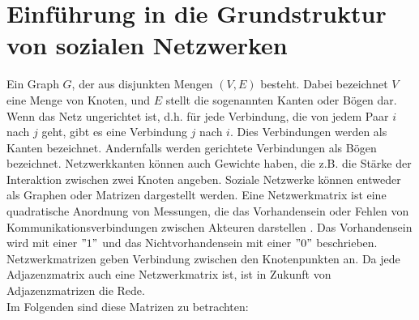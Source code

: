\section{Einführung in die Grundstruktur von sozialen Netzwerken}
Ein Graph $G$, der aus disjunkten Mengen $(V ,E)$ besteht. Dabei bezeichnet $V$ eine Menge von Knoten, und $E$ stellt die sogenannten Kanten oder Bögen dar.\\
Wenn das Netz ungerichtet ist, d.h. für jede Verbindung, die von jedem Paar $i$ nach $j$ geht, gibt es eine Verbindung $j$ nach $i$. Dies Verbindungen werden als Kanten bezeichnet. Andernfalls werden gerichtete Verbindungen
als Bögen bezeichnet. Netzwerkkanten können auch Gewichte haben, die z.B. die Stärke der Interaktion zwischen zwei Knoten angeben.
Soziale Netzwerke können entweder als Graphen oder Matrizen dargestellt werden. Eine Netzwerkmatrix ist eine quadratische Anordnung von Messungen, die das Vorhandensein oder Fehlen von Kommunikationsverbindungen zwischen Akteuren darstellen \cite{Hanneman}. Das Vorhandensein wird mit einer $"1"$ und das Nichtvorhandensein mit einer $"0"$ beschrieben. Netzwerkmatrizen geben Verbindung zwischen den Knotenpunkten an. Da jede Adjazenzmatrix auch eine Netzwerkmatrix ist, ist in Zukunft von Adjazenzmatrizen die Rede. \\
Im Folgenden sind diese Matrizen zu betrachten: \\
 
